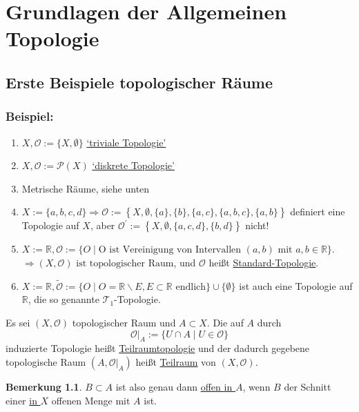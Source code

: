 \documentclass[a4paper,11pt,notitlepage]{report}
\theoremstyle{definition}
\newtheorem{remark}{Bemerkung}[chapter]
\newcommand{\R}{{\ensuremath{\mathbb{R}}}}
\newcommand{\OO}{{\ensuremath{\mathcal{O}}}}
\newenvironment{bsp}[1]
{
\setlength{\fboxsep}{10pt}
\subsection*{Beispiel: #1}
\begin{upshape}
}
{
\end{upshape}
}
\newenvironment{definition}[1]{
	\begin{definitions}
	\marginnote{\emph{#1}}
}{\end{definitions}}
\begin{document}
\newpage
\renewcommand{\thechapter}{\Roman{chapter}}
\chapter{Grundlagen der Allgemeinen Topologie}
\section{Erste Beispiele topologischer Räume}
\begin{bsp}{}
	\begin{enumerate}[(1)]
		\item $X, \OO := \{X, \emptyset\}$ \underline{`triviale Topologie'}
		\item $X, \OO := \mathcal{P}(X)$ \underline{`diskrete Topologie'}
		\item Metrische Räume, siehe unten
		\item $X:= \{a,b,c,d\} \Rightarrow \OO := \left\{X, \emptyset, \{a\}, \{b\}, \{a,c\}, \{a,b,c\}, \{a,b\} \right \}$ definiert eine Topologie auf $X$, aber $\OO^\prime:= \left \{ X, \emptyset, \{a,c,d\}, \{b,d\} \right \}$ nicht!
		\item $X := \R, \OO := \{O \mid \text{O ist Vereinigung von Intervallen } (a,b) \text{ mit } a,b \in \R\}$. $\Rightarrow (X, \OO) \text{ ist topologischer Raum}$, und $\OO$ heißt \underline{Standard-Topologie}.
		\item $X:= \R, \tilde{\OO} := \{O \mid O = \R \backslash E, E \subset \R \text{ endlich}\} \cup \{\emptyset\}$ ist auch eine Topologie auf $\R$, die so genannte $\mathcal{T}_1$-Topologie.
	\end{enumerate}
\end{bsp}

\begin{definition}{Teilraumtopologie}
Es sei $(X, \OO)$ topologischer Raum und $A \subset X$. Die auf $A$ durch
$$\OO \Big |_{A} := \{U \cap A \mid U \in \OO \}$$
induzierte Topologie heißt \underline{Teilraumtopologie} und der dadurch gegebene topologische Raum $(A, \OO \Big |_{A})$ heißt \underline{Teilraum} von $(X, \OO)$.
\end{definition}

\begin{remark}
$B \subset A$ ist also genau dann \underline{offen \underline{in $A$}}, wenn $B$ der Schnitt einer \underline{in $X$} offenen Menge mit $A$ ist.
\end{remark}
\end{document}

